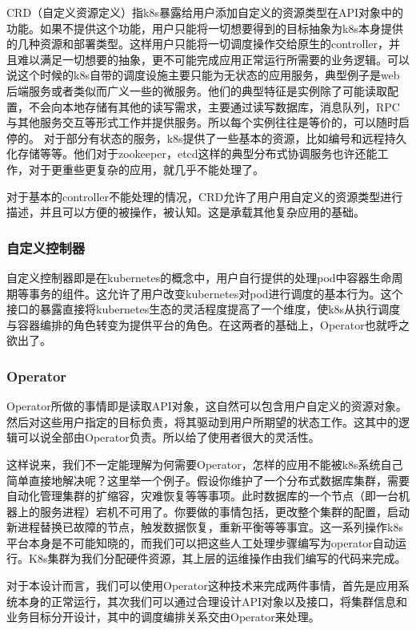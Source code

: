 CRD（自定义资源定义）指k8s暴露给用户添加自定义的资源类型在API对象中的功能。如果不提供这个功能，用户只能将一切想要得到的目标抽象为k8s本身提供的几种资源和部署类型。这样用户只能将一切调度操作交给原生的controller，并且难以满足一切想要的抽象，更不可能完成应用正常运行所需要的业务逻辑。可以说这个时候的k8s自带的调度设施主要只能为无状态的应用服务，典型例子是web后端服务或者类似而广义一些的微服务。他们的典型特征是实例除了可能读取配置，不会向本地存储有其他的读写需求，主要通过读写数据库，消息队列，RPC与其他服务交互等形式工作并提供服务。所以每个实例往往是等价的，可以随时启停的。
对于部分有状态的服务，k8s提供了一些基本的资源，比如编号和远程持久化存储等等。他们对于zookeeper，etcd这样的典型分布式协调服务也许还能工作，对于更重些更复杂的应用，就几乎不能处理了。

对于基本的controller不能处理的情况，CRD允许了用户用自定义的资源类型进行描述，并且可以方便的被操作，被认知。这是承载其他复杂应用的基础。

\subsubsection*{自定义控制器}

自定义控制器即是在kubernetes的概念中，用户自行提供的处理pod中容器生命周期等事务的组件。这允许了用户改变kubernetes对pod进行调度的基本行为。这个接口的暴露直接将kubernetes生态的灵活程度提高了一个维度，使k8s从执行调度与容器编排的角色转变为提供平台的角色。在这两者的基础上，Operator也就呼之欲出了。

\subsubsection*{Operator}

Operator所做的事情即是读取API对象，这自然可以包含用户自定义的资源对象。然后对这些用户指定的目标负责，将其驱动到用户所期望的状态工作。这其中的逻辑可以说全部由Operator负责。所以给了使用者很大的灵活性。

这样说来，我们不一定能理解为何需要Operator，怎样的应用不能被k8s系统自己简单直接地解决呢？这里举一个例子。假设你维护了一个分布式数据库集群，需要自动化管理集群的扩缩容，灾难恢复等等事项。此时数据库的一个节点（即一台机器上的服务进程）宕机不可用了。你要做的事情包括，更改整个集群的配置，启动新进程替换已故障的节点，触发数据恢复，重新平衡等等事宜。这一系列操作k8s平台本身是不可能知晓的，而我们可以把这些人工处理步骤编写为operator自动运行。K8s集群为我们分配硬件资源，其上层的运维操作由我们编写的代码来完成。

对于本设计而言，我们可以使用Operator这种技术来完成两件事情，首先是应用系统本身的正常运行，其次我们可以通过合理设计API对象以及接口，将集群信息和业务目标分开设计，其中的调度编排关系交由Operator来处理。
